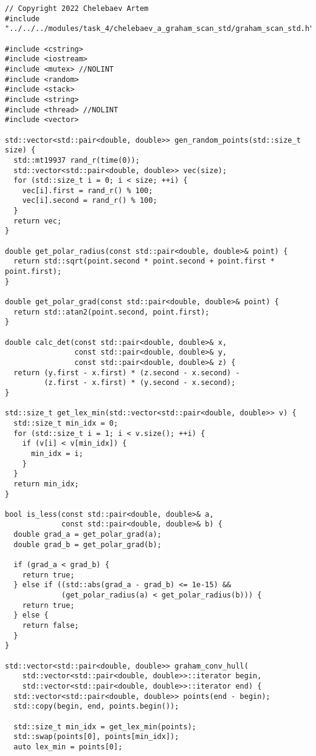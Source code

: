 \documentclass{report}
\begin{document}
\begin{lstlisting}
// Copyright 2022 Chelebaev Artem
#include "../../../modules/task_4/chelebaev_a_graham_scan_std/graham_scan_std.h"

#include <cstring>
#include <iostream>
#include <mutex> //NOLINT
#include <random>
#include <stack>
#include <string>
#include <thread> //NOLINT
#include <vector>

std::vector<std::pair<double, double>> gen_random_points(std::size_t size) {
  std::mt19937 rand_r(time(0));
  std::vector<std::pair<double, double>> vec(size);
  for (std::size_t i = 0; i < size; ++i) {
    vec[i].first = rand_r() % 100;
    vec[i].second = rand_r() % 100;
  }
  return vec;
}

double get_polar_radius(const std::pair<double, double>& point) {
  return std::sqrt(point.second * point.second + point.first * point.first);
}

double get_polar_grad(const std::pair<double, double>& point) {
  return std::atan2(point.second, point.first);
}

double calc_det(const std::pair<double, double>& x,
                const std::pair<double, double>& y,
                const std::pair<double, double>& z) {
  return (y.first - x.first) * (z.second - x.second) -
         (z.first - x.first) * (y.second - x.second);
}

std::size_t get_lex_min(std::vector<std::pair<double, double>> v) {
  std::size_t min_idx = 0;
  for (std::size_t i = 1; i < v.size(); ++i) {
    if (v[i] < v[min_idx]) {
      min_idx = i;
    }
  }
  return min_idx;
}

bool is_less(const std::pair<double, double>& a,
             const std::pair<double, double>& b) {
  double grad_a = get_polar_grad(a);
  double grad_b = get_polar_grad(b);

  if (grad_a < grad_b) {
    return true;
  } else if ((std::abs(grad_a - grad_b) <= 1e-15) &&
             (get_polar_radius(a) < get_polar_radius(b))) {
    return true;
  } else {
    return false;
  }
}

std::vector<std::pair<double, double>> graham_conv_hull(
    std::vector<std::pair<double, double>>::iterator begin,
    std::vector<std::pair<double, double>>::iterator end) {
  std::vector<std::pair<double, double>> points(end - begin);
  std::copy(begin, end, points.begin());

  std::size_t min_idx = get_lex_min(points);
  std::swap(points[0], points[min_idx]);
  auto lex_min = points[0];


\end{lstlisting}
\end{document}
